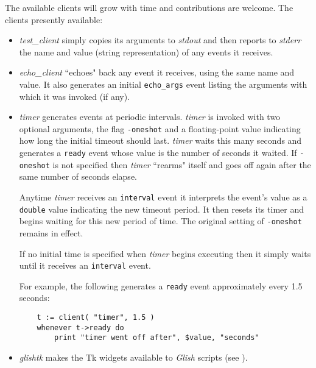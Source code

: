 The available clients will grow with time and contributions are welcome.
The clients presently available:
\begin{itemize}

\item {\em test\_client\/}
simply copies its arguments to {\em stdout}
and then reports to {\em stderr} the name and value (string representation)
of any events it receives.

\item {\em echo\_client\/}
``echoes" back any event it receives,
using the same name and value.  It also generates an initial {\tt echo\_args}
event listing the arguments with which it was invoked (if any).

\item {\em timer\/}
generates events at periodic intervals.  {\em timer}
is invoked with two optional arguments, the flag {\tt -oneshot} and a
floating-point value indicating how long the initial timeout should last.
{\em timer} waits this many seconds and generates a {\tt ready} event whose
value is the number of seconds it waited.  If {\tt -oneshot} is not
specified then {\em timer} ``rearms" itself and goes off again after the
same number of seconds elapse.

Anytime {\em timer} receives an {\tt interval} event it interprets the
event's value as a {\tt double} value indicating the new timeout period.
It then resets its timer and begins waiting for this new period of time.
The original setting of {\tt -oneshot} remains in effect.

If no initial time is specified when {\em timer} begins executing then
it simply waits until it receives an {\tt interval} event.

For example, the following generates a {\tt ready} event approximately
every 1.5 seconds:
\begin{verbatim}
    t := client( "timer", 1.5 )
    whenever t->ready do
        print "timer went off after", $value, "seconds"
\end{verbatim}

\item {\em glishtk\/}
makes the Tk widgets available to {\em Glish} scripts (see ).

\end{itemize}
